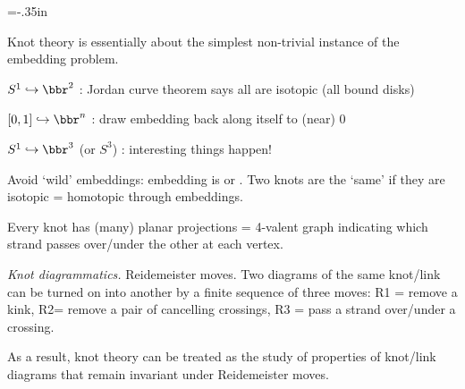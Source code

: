 




\vsize=8.9in
\voffset=-.35in
\loadmsbm



\dl{\displaystyle}
\ctln{\centerline}
\ssk{\smallskip}
\msk{\medskip}
\bsk{\bigskip}
\ubr{\underbar}
\lra{$\Leftrightarrow$}
\ra{\rightarrow}
\del{\partial}

\overfullrule=0pt
\parindent=0pt



\msk


\bsk

Knot theory is essentially about the simplest non-trivial
instance of the embedding problem.

\ssk

$S^1\hookrightarrow \bbr^2$ : Jordan curve theorem says all are isotopic (all bound disks)

$[0,1]\hookrightarrow \bbr^n$ : draw embedding back along itself to (near) $0$

$S^1\hookrightarrow \bbr^3$ (or $S^3$) : interesting things happen!

\ssk

Avoid `wild' embeddings: embedding is  or . Two knots are the `same' if
they are isotopic = homotopic through embeddings.

\ssk

Every knot has (many) planar projections = 4-valent graph indicating which strand passes
over/under the other at each vertex.

{\it Knot diagrammatics.} Reidemeister moves. Two diagrams of the same knot/link can be turned on into 
another by a finite sequence of three moves: R1 = remove a kink, R2= remove a pair of cancelling 
crossings, R3 = pass a strand over/under a crossing.

\ssk

As a result, knot theory can be treated as the study of properties of knot/link diagrams
that remain invariant under Reidemeister moves.

